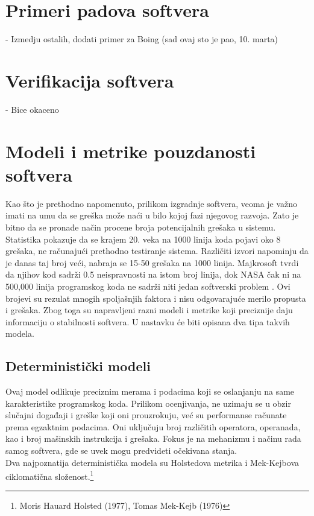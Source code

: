 \documentclass[a4paper]{article}
\begin{document}
\section{Primeri padova softvera}
\label{sec:primeri}
- Izmedju ostalih, dodati primer za Boing (sad ovaj sto je pao, 10. marta) \\

\section{Verifikacija softvera}	
\label{sec:verifikacija}

- Bice okaceno

\section{Modeli i metrike pouzdanosti softvera}	
\label{sec:modeli_metrike}

Kao što je prethodno napomenuto, prilikom izgradnje softvera, veoma je važno imati na umu da se greška može naći u bilo kojoj fazi njegovog razvoja. Zato je bitno da se pronađe način procene broja potencijalnih grešaka u sistemu.\\
Statistika pokazuje da se krajem 20. veka na 1000 linija koda pojavi oko 8 grešaka, ne računajući prethodno testiranje sistema. Različiti izvori napominju da je danas taj broj veći, nabraja se 15-50 grešaka na 1000 linija. Majkrosoft tvrdi da njihov kod sadrži 0.5 neispravnosti na istom broj linija, dok NASA čak ni na 500,000 linija programskog koda ne sadrži niti jedan softverski problem \cite{Statistika_prosek_gresaka}. Ovi brojevi su rezulat mnogih spoljašnjih faktora i nisu odgovarajuće merilo propusta i grešaka. Zbog toga su napravljeni razni modeli i metrike koji preciznije daju informaciju o stabilnosti softvera. U nastavku će biti opisana dva tipa takvih modela.\\


\subsection{Deterministički modeli}
\label{sec:deterministicki}

Ovaj model odlikuje preciznim merama i podacima koji se oslanjanju na same karakteristike programskog koda. Prilikom ocenjivanja, ne uzimaju se u obzir slučajni događaji i greške koji oni prouzrokuju, već su performanse računate prema egzaktnim podacima. Oni uključuju broj različitih operatora, operanada, kao i broj mašinskih instrukcija i grešaka. Fokus je na mehanizmu i načinu rada samog softvera, gde se uvek mogu predvideti očekivana stanja.\\
Dva najpoznatija deterministička modela su Holstedova metrika i Mek-Kejbova ciklomatična složenost.\footnote{Moris Hauard Holsted (1977), Tomas Mek-Kejb (1976)}
\end{document}

